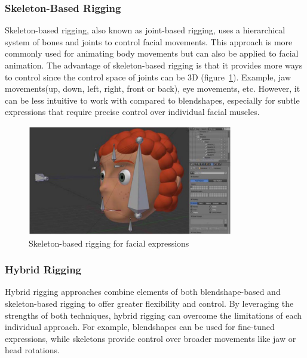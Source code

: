 \documentclass[../../main.tex]{subfiles}
\begin{document}
\subsubsection{Skeleton-Based Rigging}
\label{ch:facial_expressions:related_work:face_rigging:skeleton_based_rigging}

Skeleton-based rigging, also known as joint-based rigging, uses a hierarchical system of bones and joints to control facial movements. This approach is more commonly used for animating body movements but can also be applied to facial animation. The advantage of skeleton-based rigging is that it provides more ways to control since the control space of joints can be 3D (figure~\ref{ch:facial_expressions:fig:skeleton_based_rigging}). Example, jaw movements(up, down, left, right, front or back), eye movements, etc. However, it can be less intuitive to work with compared to blendshapes, especially for subtle expressions that require precise control over individual facial muscles.

\begin{figure}
    \centering
    \includegraphics[width=0.8\textwidth]{chapters/facial_expressions/images/skeleton_based_rigging.png}
    \caption{Skeleton-based rigging for facial expressions}
    \label{ch:facial_expressions:fig:skeleton_based_rigging}
\end{figure}

\subsubsection{Hybrid Rigging}
\label{ch:facial_expressions:related_work:face_rigging:hybrid_rigging}

Hybrid rigging approaches combine elements of both blendshape-based and skeleton-based rigging to offer greater flexibility and control. By leveraging the strengths of both techniques, hybrid rigging can overcome the limitations of each individual approach. For example, blendshapes can be used for fine-tuned expressions, while skeletons provide control over broader movements like jaw or head rotations. 
\end{document}
